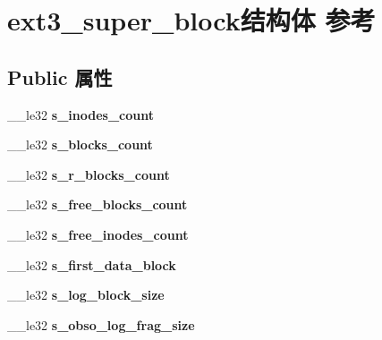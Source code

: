 \hypertarget{structext3__super__block}{}\section{ext3\+\_\+super\+\_\+block结构体 参考}
\label{structext3__super__block}
\subsection*{Public 属性}
\begin{DoxyCompactItemize}
\item 
\mbox{\label{structext3__super__block_a0dd225b647385604ca75708430cfd859}} 
\+\_\+\+\_\+le32 {\bfseries s\+\_\+inodes\+\_\+count}
\item 
\mbox{\label{structext3__super__block_a39c63ce1d0d342039f3a71e3c4f955af}} 
\+\_\+\+\_\+le32 {\bfseries s\+\_\+blocks\+\_\+count}
\item 
\mbox{\label{structext3__super__block_abc31560939b773e587403c4077a80cb1}} 
\+\_\+\+\_\+le32 {\bfseries s\+\_\+r\+\_\+blocks\+\_\+count}
\item 
\mbox{\label{structext3__super__block_a7cdce3db7ebf49ac9fde6f18a88386ff}} 
\+\_\+\+\_\+le32 {\bfseries s\+\_\+free\+\_\+blocks\+\_\+count}
\item 
\mbox{\label{structext3__super__block_aef770f95a6f07c9a2ad57522c4bb17e7}} 
\+\_\+\+\_\+le32 {\bfseries s\+\_\+free\+\_\+inodes\+\_\+count}
\item 
\mbox{\label{structext3__super__block_a508d163d9fbd20d0321952430f3b2ef6}} 
\+\_\+\+\_\+le32 {\bfseries s\+\_\+first\+\_\+data\+\_\+block}
\item 
\mbox{\label{structext3__super__block_aba390db35573fcc4dffad1e69ec14d0b}} 
\+\_\+\+\_\+le32 {\bfseries s\+\_\+log\+\_\+block\+\_\+size}
\item 
\mbox{\label{structext3__super__block_a2949c2aa838f49916449bc316e902c79}} 
\+\_\+\+\_\+le32 {\bfseries s\+\_\+obso\+\_\+log\+\_\+frag\+\_\+size}

\end{DoxyCompactItemize}
